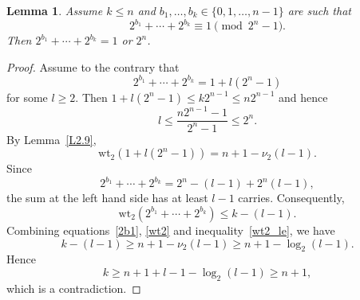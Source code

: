 \documentclass{amsart}
\newtheorem{lem}[thm]{Lemma}
\numberwithin{equation}{section}
\theoremstyle{definition}
\newcommand{\wt}{\text{wt}}
\begin{document}
\begin{lem}\label{L2.10}
Assume $k\le n$ and $b_1,\dots,b_k\in\{0,1,\dots,n-1\}$ are such that
\[
2^{b_1}+\cdots+2^{b_k}\equiv 1\pmod{2^n-1}.
\]
Then $2^{b_1}+\cdots+2^{b_k}=1$ or $2^n$.
\end{lem}

\begin{proof}
Assume to the contrary that 
\begin{equation}\label{2b1}
2^{b_1}+\cdots+2^{b_k}=1+l(2^n-1)
\end{equation}
for some $l\ge 2$. Then $1+l(2^n-1)\le k 2^{n-1}\le n2^{n-1}$ and hence
\[
l\le \frac{n 2^{n-1}-1}{2^n-1}\le 2^n.
\]
By Lemma~\ref{L2.9},
\begin{equation}\label{wt2}
\wt_2(1+l(2^n-1))=n+1-\nu_2(l-1).
\end{equation}
Since
\[
2^{b_1}+\cdots+2^{b_k}=2^n-(l-1)+2^n(l-1),
\]
the sum at the left hand side has at least $l-1$ carries. Consequently,
\begin{equation}\label{wt2_le}
\wt_2(2^{b_1}+\cdots+2^{b_k})\le k-(l-1).
\end{equation}
Combining equations~\eqref{2b1}, \eqref{wt2} and inequality~\eqref{wt2_le}, we have
\[
k-(l-1)\ge n+1-\nu_2(l-1)\ge n+1-\log_2(l-1).
\]
Hence 
\[
k\ge n+1+l-1-\log_2(l-1)\ge n+1,
\]
which is a contradiction.
\end{proof}
\end{document}
